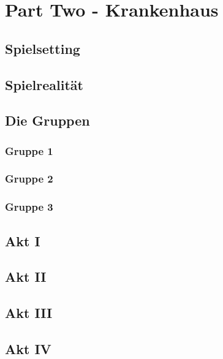 \documentclass[12pt, a4paper, openany]{report}
\begin{document}
\chapter{Part Two - Krankenhaus}
\section{Spielsetting}
\section{Spielrealität}
\section{Die Gruppen}
\subsection{Gruppe 1}
\subsection{Gruppe 2}
\subsection{Gruppe 3}
\section{Akt I}
\section{Akt II}
\section{Akt III}
\section{Akt IV}
\end{document}
